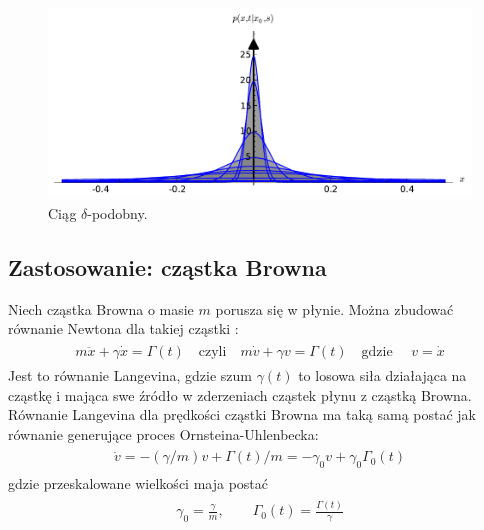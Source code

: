 \documentclass[a4paper,12pt,polish]{sphinxmanual}
\begin{document}
\begin{figure}[htbp]
\centering
\capstart

\includegraphics[width=0.800\linewidth]{sage_chIII031_02.pdf}
\caption{Ciąg $\delta$-podobny.}\end{figure}


\subsection{Zastosowanie: cząstka Browna}
\label{ch3/chIII032:zastosowanie-czastka-browna}
Niech cząstka Browna o masie $m$ porusza się w płynie. Można zbudować równanie Newtona dla takiej cząstki :
\label{ch3/chIII032:equation-eqn25}\begin{gather}
\begin{split}m\ddot x + \gamma \dot x = \Gamma(t) \quad \mbox{czyli} \quad m \dot v + \gamma v = \Gamma(t) \quad \mbox{gdzie } \quad v=\dot x\end{split}\label{ch3/chIII032-eqn25}
\end{gather}
Jest to równanie Langevina, gdzie szum $\gamma(t)$ to losowa siła działająca na cząstkę i mająca swe źródło w zderzeniach cząstek płynu z cząstką Browna. Równanie Langevina dla prędkości cząstki Browna ma taką samą postać jak równanie generujące proces Ornsteina-Uhlenbecka:
\label{ch3/chIII032:equation-eqn26}\begin{gather}
\begin{split}\dot v = -(\gamma/m) v + \Gamma(t)/m = - \gamma_0 v + \gamma_0 \Gamma_0(t)\end{split}\label{ch3/chIII032-eqn26}
\end{gather}
gdzie przeskalowane wielkości maja postać
\label{ch3/chIII032:equation-eqn27}\begin{gather}
\begin{split}\gamma_0 = \frac{\gamma}{m}, \qquad \Gamma_0(t) = \frac{\Gamma(t)}{\gamma}\end{split}\label{ch3/chIII032-eqn27}
\end{gather}
\end{document}
